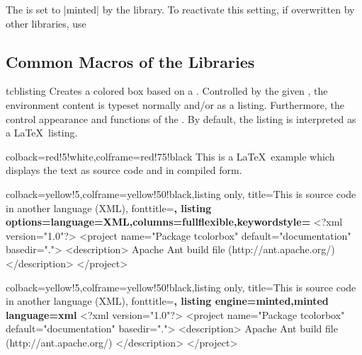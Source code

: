 The  is set to |minted| by the library.
To reactivate this setting, if overwritten by other libraries, use
\begin{dispListing}
\end{dispListing}


\subsection{Common Macros of the Libraries}

\begin{docEnvironment}{tcblisting}{}
  Creates a colored box based on a .
  Controlled by the given , the
  environment content is typeset normally and/or as a listing.
  Furthermore, the  control appearance and functions of
  the .
  By default, the listing is interpreted as a \LaTeX\ listing.
\begin{dispExample}
\begin{tcblisting}{colback=red!5!white,colframe=red!75!black}
This is a \LaTeX\ example which displays the text as source code
and in compiled form.
\end{tcblisting}
\end{dispExample}

\clearpage

\begin{dispExample}
\begin{tcblisting}{colback=yellow!5,colframe=yellow!50!black,listing only,
    title=This is source code in another language (XML), fonttitle=\bfseries,
  listing options={language=XML,columns=fullflexible,keywordstyle=\color{red}}}
<?xml version="1.0"?>
<project name="Package tcolorbox" default="documentation" basedir=".">
  <description>
    Apache Ant build file (http://ant.apache.org/)
  </description>
</project>
\end{tcblisting}
\end{dispExample}

\enlargethispage*{10mm}

\begin{dispExample}
\begin{tcblisting}{colback=yellow!5,colframe=yellow!50!black,listing only,
    title=This is source code in another language (XML), fonttitle=\bfseries,
  listing engine=minted,minted language=xml}
<?xml version="1.0"?>
<project name="Package tcolorbox" default="documentation" basedir=".">
  <description>
    Apache Ant build file (http://ant.apache.org/)
  </description>
</project>
\end{tcblisting}
\end{dispExample}




\end{docEnvironment}

